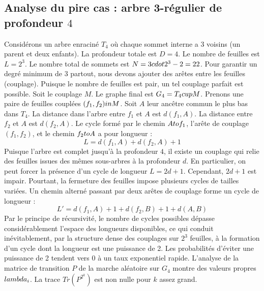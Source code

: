 \documentclass[12pt,a4paper]{article}
\begin{document}
\subsection{Analyse du pire cas : arbre 3-r\'egulier de profondeur $4$}
Consid\'erons un arbre enracin\'e $T_{4}$ o\`u chaque sommet interne a 3 voisins (un parent et deux enfants).
La profondeur totale est $D = 4$.
Le nombre de feuilles est $L = 2^{3}$.
Le nombre total de sommets est $N = 3 \\cdot 2^{3} - 2 = 22$.
Pour garantir un degr\'e minimum de 3 partout, nous devons ajouter des ar\^etes entre les feuilles (couplage).
Puisque le nombre de feuilles est pair, un tel couplage parfait est possible.
Soit le couplage $M$. Le graphe final est $G_{4} = T_{4} \\cup M$.
Prenons une paire de feuilles coupl\'ees $(f_1, f_2) \\in M$.
Soit $A$ leur anc\^etre commun le plus bas dans $T_{4}$.
La distance dans l'arbre entre $f_1$ et $A$ est $d(f_1, A)$.
La distance entre $f_2$ et $A$ est $d(f_2, A)$.
Le cycle form\'e par le chemin $A \\to f_1$, l'ar\^ete de couplage $(f_1, f_2)$, et le chemin $f_2 \\to A$ a pour longueur :
$$ L = d(f_1, A) + d(f_2, A) + 1 $$
Puisque l'arbre est complet jusqu'\`a la profondeur $4$, il existe un couplage qui relie des feuilles issues des m\^emes sous-arbres \`a la profondeur $d$.
En particulier, on peut forcer la pr\'esence d'un cycle de longueur $L = 2d + 1$. Cependant, $2d+1$ est impair.
Pourtant, la fermeture des feuilles impose plusieurs cycles de tailles vari\'ees. Un chemin altern\'e passant par deux ar\^etes de couplage forme un cycle de longueur :
$$ L' = d(f_1, A) + 1 + d(f_2, B) + 1 + d(A, B) $$
Par le principe de r\'ecursivit\'e, le nombre de cycles possibles d\'epasse consid\'erablement l'espace des longueurs disponibles, ce qui conduit in\'evitablement, par la structure dense des couplages sur $2^{3}$ feuilles, \`a la formation d'un cycle dont la longueur est une puissance de 2. Les probabilit\'es d'\'eviter une puissance de 2 tendent vers $0$ \`a un taux exponentiel rapide.
L'analyse de la matrice de transition $P$ de la marche al\'eatoire sur $G_{4}$ montre des valeurs propres $\\lambda_i$. La trace $Tr(P^{2^k})$ est non nulle pour $k$ assez grand.
\end{document}
